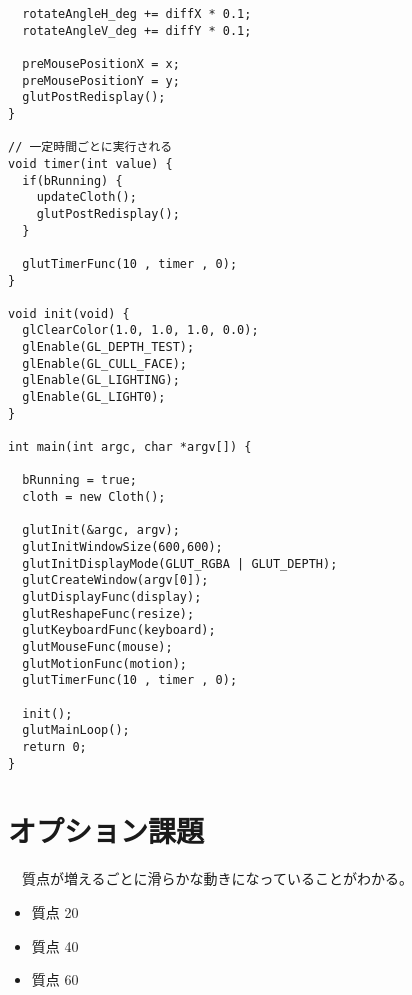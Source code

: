 \documentclass{scrartcl}
\begin{document}
\begin{verbatim}
  rotateAngleH_deg += diffX * 0.1;
  rotateAngleV_deg += diffY * 0.1;

  preMousePositionX = x;
  preMousePositionY = y;
  glutPostRedisplay();
}

// 一定時間ごとに実行される
void timer(int value) {
  if(bRunning) {
    updateCloth();
    glutPostRedisplay();
  }

  glutTimerFunc(10 , timer , 0);
}

void init(void) {
  glClearColor(1.0, 1.0, 1.0, 0.0);
  glEnable(GL_DEPTH_TEST);
  glEnable(GL_CULL_FACE);
  glEnable(GL_LIGHTING);
  glEnable(GL_LIGHT0);
}

int main(int argc, char *argv[]) {

  bRunning = true;
  cloth = new Cloth();

  glutInit(&argc, argv);
  glutInitWindowSize(600,600);
  glutInitDisplayMode(GLUT_RGBA | GLUT_DEPTH);
  glutCreateWindow(argv[0]);
  glutDisplayFunc(display);
  glutReshapeFunc(resize);
  glutKeyboardFunc(keyboard);
  glutMouseFunc(mouse);
  glutMotionFunc(motion);
  glutTimerFunc(10 , timer , 0);

  init();
  glutMainLoop();
  return 0;
}
\end{verbatim}
\section{オプション課題}
\label{sec:org8f7e648}
　質点が増えるごとに滑らかな動きになっていることがわかる。\\
\begin{itemize}
\item 質点 20\\
\item 質点 40\\
\item 質点 60\\
\end{itemize}
\end{document}
